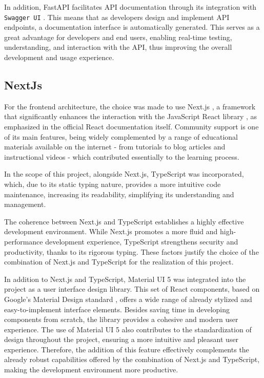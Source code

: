 In addition, FastAPI facilitates API documentation through its integration with \texttt{Swagger UI} \cite{swaggerui2023}. This means that as developers design and implement API endpoints, a documentation interface is automatically generated. This serves as a great advantage for developers and end users, enabling real-time testing, understanding, and interaction with the API, thus improving the overall development and usage experience.

\subsection{NextJs}
For the frontend architecture, the choice was made to use Next.js \cite{nextjsDocs}, a framework that significantly enhances the interaction with the JavaScript React library \cite{reactDocs}, as emphasized in the official React documentation itself. Community support is one of its main features, being widely complemented by a range of educational materials available on the internet - from tutorials to blog articles and instructional videos - which contributed essentially to the learning process.

In the scope of this project, alongside Next.js, TypeScript \cite{typescriptLang} was incorporated, which, due to its static typing nature, provides a more intuitive code maintenance, increasing its readability, simplifying its understanding and management.

The coherence between Next.js and TypeScript establishes a highly effective development environment. While Next.js promotes a more fluid and high-performance development experience, TypeScript strengthens security and productivity, thanks to its rigorous typing. These factors justify the choice of the combination of Next.js and TypeScript for the realization of this project.

In addition to Next.js and TypeScript, Material UI 5 \cite{muiDocs} was integrated into the project as a user interface design library. This set of React components, based on Google's Material Design standard \cite{m3Docs}, offers a wide range of already stylized and easy-to-implement interface elements. Besides saving time in developing components from scratch, the library provides a cohesive and modern user experience. The use of Material UI 5 also contributes to the standardization of design throughout the project, ensuring a more intuitive and pleasant user experience. Therefore, the addition of this feature effectively complements the already robust capabilities offered by the combination of Next.js and TypeScript, making the development environment more productive.

